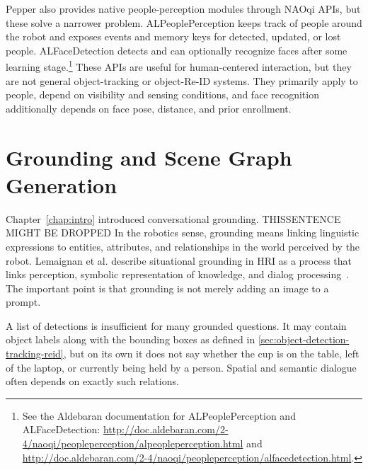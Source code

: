 Pepper also provides native peo\-ple-per\-cep\-tion mod\-ules through NAOqi APIs, but these solve a narrower problem. ALPeoplePerception keeps track of people around the robot and exposes events and memory keys for detected, updated, or lost people. ALFaceDetection detects and can optionally recognize faces after some learning stage.\footnote{See the Aldebaran documentation for ALPeoplePerception and ALFaceDetection: \url{http://doc.aldebaran.com/2-4/naoqi/peopleperception/alpeopleperception.html} and \url{http://doc.aldebaran.com/2-4/naoqi/peopleperception/alfacedetection.html}.} These APIs are useful for human-centered interaction, but they are not general object-tracking or object-Re-ID systems. They primarily apply to people, depend on visibility and sensing conditions, and face recognition additionally depends on face pose, distance, and prior enrollment.


\section{Grounding and Scene Graph Generation}\label{sec:grounding-sgg}


Chapter~\ref{chap:intro} introduced conversational grounding. THISSENTENCE MIGHT BE DROPPED In the robotics sense, grounding means linking linguistic expressions to entities, attributes, and relationships in the world perceived by the robot. Lemaignan et al. describe situational grounding in HRI as a process that links perception, symbolic representation of knowledge, and dialog processing~\cite[181--182]{lemaignan_grounding_2012}. The important point is that grounding is not merely adding an image to a prompt.


A list of detections is insufficient for many grounded questions. It may contain object labels along with the bounding boxes as defined in \ref{sec:object-detection-tracking-reid}, but on its own it does not say whether the cup is on the table, left of the laptop, or currently being held by a person. Spatial and semantic dialogue often depends on exactly such relations.

